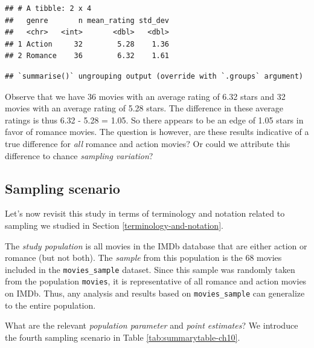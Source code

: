 \documentclass[
]{book}
\begin{document}
\begin{verbatim}
## # A tibble: 2 x 4
##   genre       n mean_rating std_dev
##   <chr>   <int>       <dbl>   <dbl>
## 1 Action     32        5.28    1.36
## 2 Romance    36        6.32    1.61
\end{verbatim}

\begin{verbatim}
## `summarise()` ungrouping output (override with `.groups` argument)
\end{verbatim}

Observe that we have 36 movies with an average rating of 6.32 stars and 32 movies with an average rating of 5.28 stars. The difference in these average ratings is thus 6.32 - 5.28 = 1.05. So there appears to be an edge of 1.05 stars in favor of romance movies. The question is however, are these results indicative of a true difference for \emph{all} romance and action movies? Or could we attribute this difference to chance \emph{sampling variation}?

\hypertarget{sampling-scenario}{%
\subsection{Sampling scenario}\label{sampling-scenario}}

Let's now revisit this study in terms of terminology and notation related to sampling we studied in Section \ref{terminology-and-notation}.

The \emph{study population} is all movies in the IMDb database that are either action or romance (but not both). The \emph{sample} from this population is the 68 movies included in the \texttt{movies\_sample} dataset. Since this sample was randomly taken from the population \texttt{movies}, it is representative of all romance and action movies on IMDb. Thus, any analysis and results based on \texttt{movies\_sample} can generalize to the entire population.

What are the relevant \emph{population parameter} and \emph{point estimates}? We introduce the fourth sampling scenario in Table \ref{tab:summarytable-ch10}.
\end{document}
